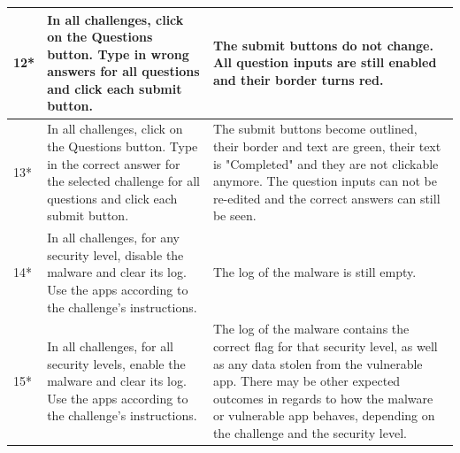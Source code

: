 \begin{center}
\begin{longtable}{|p{0.4cm} |p{5.2cm} |p{7.4cm} |}
         \hline
         12* & In all challenges, click on the Questions button. Type in wrong answers for all questions and click each submit button. & The submit buttons do not change. All question inputs are still enabled and their border turns red. \\
         \hline
         13* & In all challenges, click on the Questions button. Type in the correct answer for the selected challenge for all questions and click each submit button. & The submit buttons become outlined, their border and text are green, their text is "Completed" and they are not clickable anymore. The question inputs can not be re-edited and the correct answers can still be seen. \\
         \hline
         14* & In all challenges, for any security level, disable the malware and clear its log. Use the apps according to the challenge's instructions. & The log of the malware is still empty. \\
         \hline
         15* & In all challenges, for all security levels, enable the malware and clear its log. Use the apps according to the challenge's instructions. & The log of the malware contains the correct flag for that security level, as well as any data stolen from the vulnerable app. There may be other expected outcomes in regards to how the malware or vulnerable app behaves, depending on the challenge and the security level.\\
         \hline

        \end{longtable}
    \end{center}